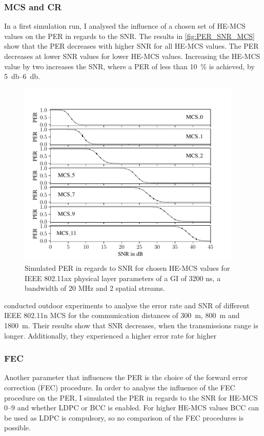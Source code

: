 \subsubsection*{\acf{MCS} and \acf{CR}}
In a first simulation run, I analysed the influence of a chosen set of HE-MCS values on the \ac{PER} in regards to the \ac{SNR}.
The results in \autoref{fig:PER_SNR_MCS} show that the \ac{PER} decreases with higher \ac{SNR} for all HE-MCS values. The
\ac{PER} decreases at lower \ac{SNR} values for lower HE-MCS values. Increasing the HE-MCS value by two increases the \ac{SNR}, where a \ac{PER} of less than
\SI{10}{\percent} is achieved, by \SIrange{5}{6}{\decibel}.
\begin{figure}[H]%
	\centering
	\includegraphics[width=0.95\textwidth]{figures/MCS_PER_to_SNR.pdf}
	\caption{Simulated PER in regards to SNR for chosen HE-MCS values for IEEE 802.11ax physical layer parameters
			of a GI of 3200 ns, a bandwidth of 20 MHz and 2 spatial streams.}
	\label{fig:PER_SNR_MCS}%
\end{figure}
\textcite{paul_characterizing_2011} conducted outdoor experiments to analyse the error rate and \ac{SNR} of different IEEE 802.11n \ac{MCS} for the
communication distances of \SI{300}{\meter}, \SI{800}{\meter} and \SI{1800}{\meter}. Their results show that \ac{SNR} decreases, when the transmissions range is longer.
Additionally, they experienced a higher error rate for higher

\subsubsection*{\acf{FEC}}
Another parameter that influences the \ac{PER} is the choice of the forward error correction (FEC) procedure. In order to
analyse the influence of the FEC procedure on the \ac{PER}, I simulated the \ac{PER} in regards to the \ac{SNR} for HE-MCS
\numrange{0}{9} and whether \ac{LDPC} or \ac{BCC} is enabled. For higher HE-MCS values \ac{BCC} can be used as \ac{LDPC} is compulsory, so no comparison of the \ac{FEC} procedures is possible.

